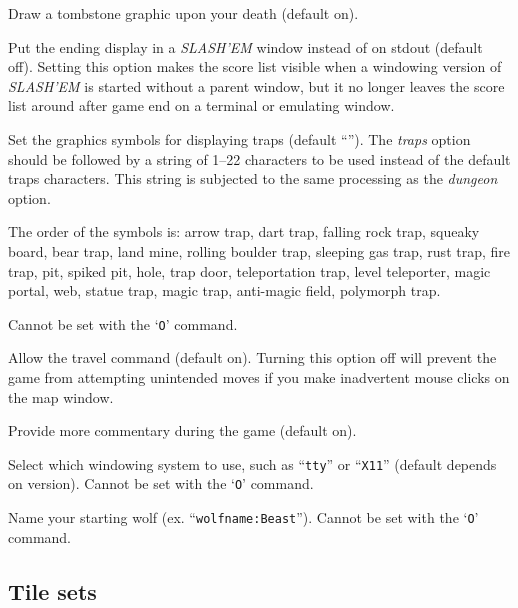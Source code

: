 \item[\ib{tombstone}]
Draw a tombstone graphic upon your death (default on).

\item[\ib{toptenwin}]
Put the ending display in a {\it SLASH'EM\/} window instead of on stdout (default off).
Setting this option makes the score list visible when a windowing version
of {\it SLASH'EM\/} is started without a parent window, but it no longer leaves
the score list around after game end on a terminal or emulating window.

\item[\ib{traps}]
Set the graphics symbols for displaying traps
(default \relax{}``'').
The
{\it traps\/} 
option should be followed by a string of 1--22
characters to be used instead of the default traps characters.
This string is subjected to the same processing as the
{\it dungeon\/} 
option.

The order of the symbols is: 
arrow trap, dart trap, falling rock trap, squeaky board, bear trap,
land mine, rolling boulder trap, sleeping gas trap, rust trap, fire trap,
pit, spiked pit, hole, trap door, teleportation trap, level teleporter,
magic portal, web, statue trap, magic trap, anti-magic field, polymorph trap.

Cannot be set with the `{\tt O}' command.

\item[\ib{travel}]
Allow the travel command (default on).  Turning this option off will
prevent the game from attempting unintended moves if you make inadvertent
mouse clicks on the map window.

\item[\ib{verbose}]
Provide more commentary during the game (default on).

\item[\ib{windowtype}]
Select which windowing system to use, such as ``{\tt tty}'' or ``{\tt X11}''
(default depends on version).
Cannot be set with the `{\tt O}' command.

\item[\ib{wolfname}]
Name your starting wolf (ex. ``{\tt wolfname:Beast}'').
Cannot be set with the `{\tt O}' command.
\elist
\nd %
\subsection*{Tile sets}

